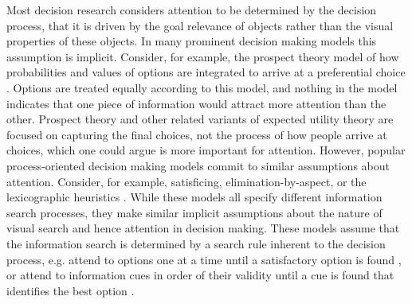\documentclass[english,natbib,man,floatsintext]{apa6}
\begin{document}
Most decision research considers attention to be determined by the decision process, that it is driven by the goal relevance of objects rather than the visual properties of these objects. In many prominent decision making models this assumption is implicit. Consider, for example, the prospect theory model of how probabilities and values of options are integrated  to arrive at a preferential choice \citep{tversky1979}. Options are treated equally according to this model, and nothing in the model indicates that one piece of information would attract more attention than the other. Prospect theory and other related variants of expected utility theory are focused on capturing the final choices, not the process of how people arrive at choices, which one could argue is more important for attention. However, popular process-oriented decision making models commit to similar assumptions about attention. Consider, for example, satisficing, elimination-by-aspect, or the lexicographic heuristics \citep{payne1988, simon1956a}. While these models all specify different information search processes, they make similar implicit assumptions about the nature of visual search and hence attention in decision making. These  models assume that the information search is determined by a search rule inherent to the decision process, e.g. attend to options one at a time until a satisfactory option is found \citep{stuttgen2012}, or attend to information cues in order of their validity until a cue is found that identifies the best option \citep{krefeld-schwalb2019a}. 
\end{document}
